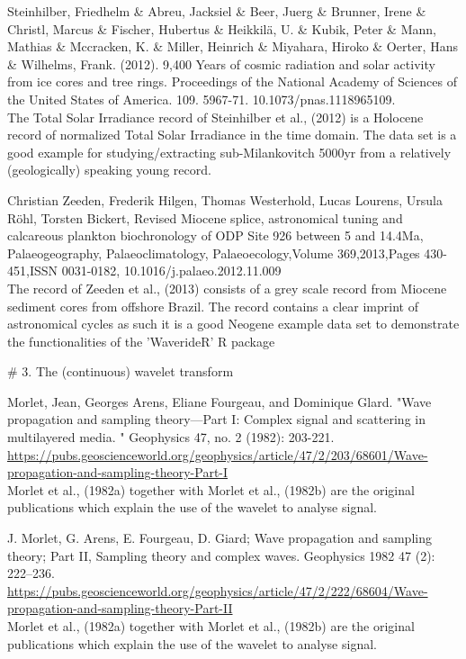 \documentclass[a4paper]{book}
\begin{document}
\begin{References}
Steinhilber, Friedhelm \& Abreu, Jacksiel \& Beer, Juerg \& Brunner,
Irene \& Christl, Marcus \& Fischer, Hubertus \& Heikkilä, U. \& Kubik,
Peter \& Mann, Mathias \& Mccracken, K. \& Miller, Heinrich \& Miyahara,
Hiroko \& Oerter, Hans \& Wilhelms, Frank. (2012).
9,400 Years of cosmic radiation and solar activity from ice cores and tree rings.
Proceedings of the National Academy of Sciences of the United States of America.
109. 5967-71. 10.1073/pnas.1118965109.
 \\{}
The Total Solar Irradiance record of Steinhilber et al., (2012) is a Holocene record of normalized
Total Solar Irradiance in the time domain. The data set is a good example for
studying/extracting sub-Milankovitch 5000yr from a relatively (geologically) speaking young record.

Christian Zeeden, Frederik Hilgen, Thomas Westerhold, Lucas Lourens, Ursula Röhl, Torsten Bickert,
Revised Miocene splice, astronomical tuning and calcareous plankton biochronology of ODP Site 926 between 5 and 14.4Ma,
Palaeogeography, Palaeoclimatology, Palaeoecology,Volume 369,2013,Pages 430-451,ISSN 0031-0182,
10.1016/j.palaeo.2012.11.009\\{}
The record of Zeeden et al., (2013) consists of a grey scale record from Miocene sediment cores from offshore
Brazil. The record contains a clear imprint of astronomical cycles as such it is a good Neogene example data set
to demonstrate the functionalities of the 'WaverideR' R package

\# 3. The (continuous) wavelet transform

Morlet, Jean, Georges Arens, Eliane Fourgeau, and Dominique Glard.
"Wave propagation and sampling theory—Part I: Complex signal and scattering in multilayered media.
" Geophysics 47, no. 2 (1982): 203-221.
\url{https://pubs.geoscienceworld.org/geophysics/article/47/2/203/68601/Wave-propagation-and-sampling-theory-Part-I}\\{}
Morlet et al., (1982a) together with Morlet et al., (1982b) are the original publications which explain the
use of the wavelet to analyse signal.

J. Morlet, G. Arens, E. Fourgeau, D. Giard;
Wave propagation and sampling theory; Part II, Sampling theory and complex waves.
Geophysics 1982 47 (2): 222–236. \url{https://pubs.geoscienceworld.org/geophysics/article/47/2/222/68604/Wave-propagation-and-sampling-theory-Part-II}\\{}
Morlet et al., (1982a) together with Morlet et al., (1982b) are the original publications which explain the
use of the wavelet to analyse signal.


\end{References}
\end{document}
